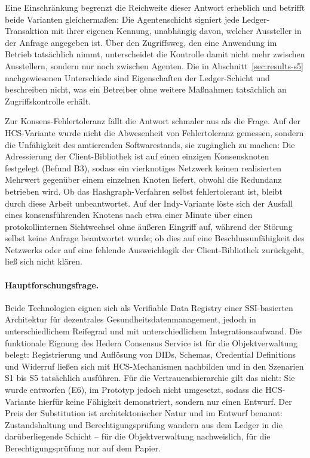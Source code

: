 Eine Einschränkung begrenzt die Reichweite dieser Antwort erheblich und betrifft beide Varianten gleichermaßen: Die Agentenschicht signiert jede Ledger-Transaktion mit ihrer eigenen Kennung, unabhängig davon, welcher Aussteller in der Anfrage angegeben ist. Über den Zugriffsweg, den eine Anwendung im Betrieb tatsächlich nimmt, unterscheidet die Kontrolle damit nicht mehr zwischen Ausstellern, sondern nur noch zwischen Agenten. Die in Abschnitt~\ref{sec:results-s5} nachgewiesenen Unterschiede sind Eigenschaften der Ledger-Schicht und beschreiben nicht, was ein Betreiber ohne weitere Maßnahmen tatsächlich an Zugriffskontrolle erhält.

Zur Konsens-Fehlertoleranz fällt die Antwort schmaler aus als die Frage. Auf der HCS-Variante wurde nicht die Abwesenheit von Fehlertoleranz gemessen, sondern die Unfähigkeit des amtierenden Softwarestands, sie zugänglich zu machen: Die Adressierung der Client-Bibliothek ist auf einen einzigen Konsensknoten festgelegt (Befund B3), sodass ein vierknotiges Netzwerk keinen realisierten Mehrwert gegenüber einem einzelnen Knoten liefert, obwohl die Redundanz betrieben wird. Ob das Hashgraph-Verfahren selbst fehlertolerant ist, bleibt durch diese Arbeit unbeantwortet. Auf der Indy-Variante löste sich der Ausfall eines konsensführenden Knotens nach etwa einer Minute über einen protokollinternen Sichtwechsel ohne äußeren Eingriff auf, während der Störung selbst keine Anfrage beantwortet wurde; ob dies auf eine Beschlussunfähigkeit des Netzwerks oder auf eine fehlende Ausweichlogik der Client-Bibliothek zurückgeht, ließ sich nicht klären.

\paragraph{Hauptforschungsfrage.} Beide Technologien eignen sich als Verifiable Data Registry einer SSI-basierten Architektur für dezentrales Gesundheitsdatenmanagement, jedoch in unterschiedlichem Reifegrad und mit unterschiedlichem Integrationsaufwand. Die funktionale Eignung des Hedera Consensus Service ist für die Objektverwaltung belegt: Registrierung und Auflösung von DIDs, Schemas, Credential Definitions und Widerruf ließen sich mit HCS-Mechanismen nachbilden und in den Szenarien S1 bis S5 tatsächlich ausführen. Für die Vertrauenshierarchie gilt das nicht: Sie wurde entworfen (E6), im Prototyp jedoch nicht umgesetzt, sodass die HCS-Variante hierfür keine Fähigkeit demonstriert, sondern nur einen Entwurf. Der Preis der Substitution ist architektonischer Natur und im Entwurf benannt: Zustandshaltung und Berechtigungsprüfung wandern aus dem Ledger in die darüberliegende Schicht -- für die Objektverwaltung nachweislich, für die Berechtigungsprüfung nur auf dem Papier.

